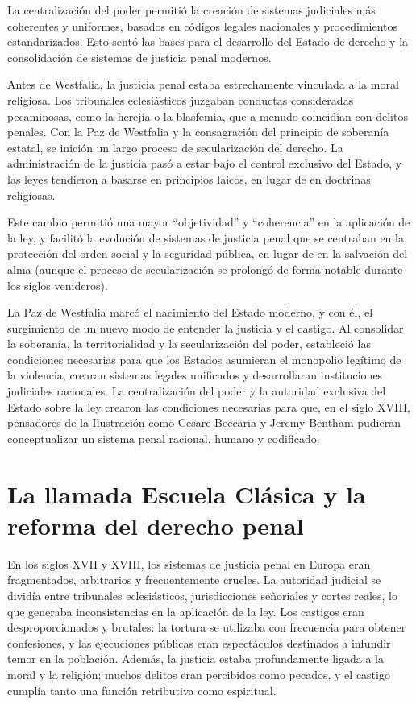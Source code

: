 \documentclass[
  spanish,
  letterpaper,
  DIV=11,
  numbers=noendperiod]{scrreprt}
\begin{document}
La centralización del poder permitió la creación de sistemas judiciales
más coherentes y uniformes, basados en códigos legales nacionales y
procedimientos estandarizados. Esto sentó las bases para el desarrollo
del Estado de derecho y la consolidación de sistemas de justicia penal
modernos.

Antes de Westfalia, la justicia penal estaba estrechamente vinculada a
la moral religiosa. Los tribunales eclesiásticos juzgaban conductas
consideradas pecaminosas, como la herejía o la blasfemia, que a menudo
coincidían con delitos penales. Con la Paz de Westfalia y la
consagración del principio de soberanía estatal, se inición un largo
proceso de secularización del derecho. La administración de la justicia
pasó a estar bajo el control exclusivo del Estado, y las leyes tendieron
a basarse en principios laicos, en lugar de en doctrinas religiosas.

Este cambio permitió una mayor ``objetividad'' y ``coherencia'' en la
aplicación de la ley, y facilitó la evolución de sistemas de justicia
penal que se centraban en la protección del orden social y la seguridad
pública, en lugar de en la salvación del alma (aunque el proceso de
secularización se prolongó de forma notable durante los siglos
venideros).

La Paz de Westfalia marcó el nacimiento del Estado moderno, y con él, el
surgimiento de un nuevo modo de entender la justicia y el castigo. Al
consolidar la soberanía, la territorialidad y la secularización del
poder, estableció las condiciones necesarias para que los Estados
asumieran el monopolio legítimo de la violencia, crearan sistemas
legales unificados y desarrollaran instituciones judiciales racionales.
La centralización del poder y la autoridad exclusiva del Estado sobre la
ley crearon las condiciones necesarias para que, en el siglo XVIII,
pensadores de la Ilustración como Cesare Beccaria y Jeremy Bentham
pudieran conceptualizar un sistema penal racional, humano y codificado.

\section{La llamada Escuela Clásica y la reforma del derecho
penal}\label{la-llamada-escuela-cluxe1sica-y-la-reforma-del-derecho-penal}

En los siglos XVII y XVIII, los sistemas de justicia penal en Europa
eran fragmentados, arbitrarios y frecuentemente crueles. La autoridad
judicial se dividía entre tribunales eclesiásticos, jurisdicciones
señoriales y cortes reales, lo que generaba inconsistencias en la
aplicación de la ley. Los castigos eran desproporcionados y brutales: la
tortura se utilizaba con frecuencia para obtener confesiones, y las
ejecuciones públicas eran espectáculos destinados a infundir temor en la
población. Además, la justicia estaba profundamente ligada a la moral y
la religión; muchos delitos eran percibidos como pecados, y el castigo
cumplía tanto una función retributiva como espiritual.
\end{document}
